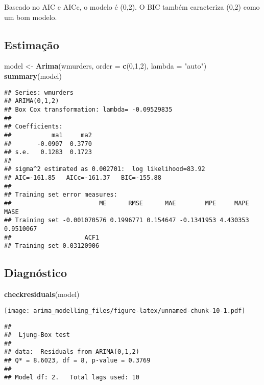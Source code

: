 \documentclass[]{article}
\newenvironment{Shaded}{\begin{snugshade}}{\end{snugshade}}
\newcommand{\DataTypeTok}[1]{\textcolor[rgb]{0.13,0.29,0.53}{#1}}
\newcommand{\DecValTok}[1]{\textcolor[rgb]{0.00,0.00,0.81}{#1}}
\newcommand{\KeywordTok}[1]{\textcolor[rgb]{0.13,0.29,0.53}{\textbf{#1}}}
\newcommand{\NormalTok}[1]{#1}
\newcommand{\StringTok}[1]{\textcolor[rgb]{0.31,0.60,0.02}{#1}}
\begin{document}
Baseado no AIC e AICc, o modelo é (0,2). O BIC também caracteriza (0,2)
como um bom modelo.

\hypertarget{estimauxe7uxe3o}{%
\subsection{Estimação}\label{estimauxe7uxe3o}}

\begin{Shaded}
\begin{Highlighting}[]
\NormalTok{model <-}\StringTok{ }\KeywordTok{Arima}\NormalTok{(wmurders, }\DataTypeTok{order =} \KeywordTok{c}\NormalTok{(}\DecValTok{0}\NormalTok{,}\DecValTok{1}\NormalTok{,}\DecValTok{2}\NormalTok{), }\DataTypeTok{lambda =} \StringTok{"auto"}\NormalTok{)}
\KeywordTok{summary}\NormalTok{(model)}
\end{Highlighting}
\end{Shaded}

\begin{verbatim}
## Series: wmurders 
## ARIMA(0,1,2) 
## Box Cox transformation: lambda= -0.09529835 
## 
## Coefficients:
##           ma1     ma2
##       -0.0907  0.3770
## s.e.   0.1283  0.1723
## 
## sigma^2 estimated as 0.002701:  log likelihood=83.92
## AIC=-161.85   AICc=-161.37   BIC=-155.88
## 
## Training set error measures:
##                        ME      RMSE      MAE        MPE     MAPE      MASE
## Training set -0.001070576 0.1996771 0.154647 -0.1341953 4.430353 0.9510067
##                    ACF1
## Training set 0.03120906
\end{verbatim}

\hypertarget{diagnuxf3stico}{%
\subsection{Diagnóstico}\label{diagnuxf3stico}}

\begin{Shaded}
\begin{Highlighting}[]
\KeywordTok{checkresiduals}\NormalTok{(model)}
\end{Highlighting}
\end{Shaded}

\texttt{[image: arima\_modelling\_files/figure-latex/unnamed-chunk-10-1.pdf]}

\begin{verbatim}
## 
##  Ljung-Box test
## 
## data:  Residuals from ARIMA(0,1,2)
## Q* = 8.6023, df = 8, p-value = 0.3769
## 
## Model df: 2.   Total lags used: 10
\end{verbatim}
\end{document}
